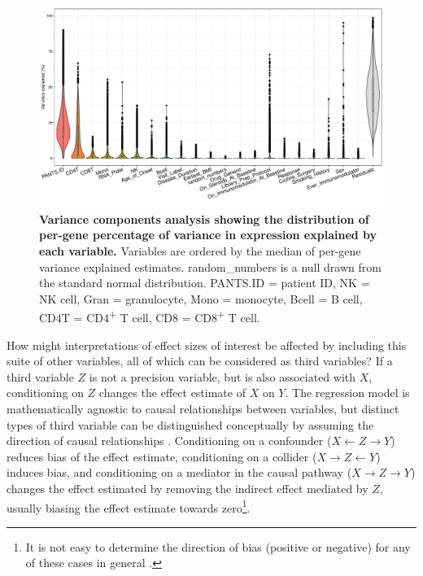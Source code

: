 \begin{figure}
    \centering
    \includegraphics[width=1.0\textwidth,page=1]{mainmatter/figures/chapter_04/dream.plotVarPart.pdf}
    \caption[
    ]{
        \textbf{Variance components analysis showing the distribution of per-gene percentage of variance in expression explained by each variable.}
        Variables are ordered by the median of per-gene variance explained estimates.
        random\_numbers is a null drawn from the standard normal distribution.
        PANTS.ID = patient ID, NK = \gls{NK} cell, Gran = granulocyte, Mono = monocyte, Bcell = B cell, CD4T = CD4\textsuperscript{+} T cell, CD8 = CD8\textsuperscript{+} T cell.
    }
    \label{fig:multipants_varPart}
\end{figure}

How might interpretations of effect sizes of interest be affected by including this suite of other variables, all of which can be considered as third variables?
If a third variable $Z$ is not a precision variable, but is also associated with $X$, conditioning on $Z$ changes the effect estimate of $X$ on $Y$.
The regression model is mathematically agnostic to causal relationships between variables,
but distinct types of third variable can be distinguished conceptually by assuming the direction of causal relationships \autocite{mackinnon2000EquivalenceMediationConfounding}.
Conditioning on a confounder ($X \leftarrow Z \rightarrow Y$) reduces bias of the effect estimate,
conditioning on a collider ($X \rightarrow Z \leftarrow Y$) induces bias,
and conditioning on a mediator in the causal pathway ($X \rightarrow Z \rightarrow Y$) changes the effect estimated by removing the indirect effect mediated by $Z$,
usually biasing the effect estimate towards zero\footnote{It is not easy to determine the direction of bias (positive or negative) for any of these cases in general \autocite{suzuki2020CausalDiagramsPitfalls}.}.

